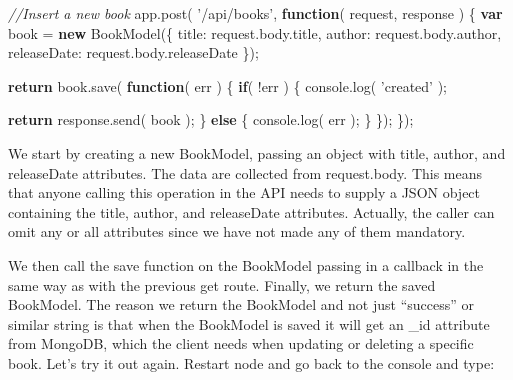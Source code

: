 \documentclass[9pt]{book}
\newenvironment{Shaded}{}{}
\newcommand{\KeywordTok}[1]{\textcolor[rgb]{0.00,0.44,0.13}{\textbf{{#1}}}}
\newcommand{\DataTypeTok}[1]{\textcolor[rgb]{0.56,0.13,0.00}{{#1}}}
\newcommand{\StringTok}[1]{\textcolor[rgb]{0.25,0.44,0.63}{{#1}}}
\newcommand{\CommentTok}[1]{\textcolor[rgb]{0.38,0.63,0.69}{\textit{{#1}}}}
\newcommand{\OtherTok}[1]{\textcolor[rgb]{0.00,0.44,0.13}{{#1}}}
\newcommand{\FunctionTok}[1]{\textcolor[rgb]{0.02,0.16,0.49}{{#1}}}
\newcommand{\NormalTok}[1]{{#1}}
\begin{document}
\begin{Shaded}
\begin{Highlighting}[]
\CommentTok{//Insert a new book}
\OtherTok{app}\NormalTok{.}\FunctionTok{post}\NormalTok{( }\StringTok{'/api/books'}\NormalTok{, }\KeywordTok{function}\NormalTok{( request, response ) \{}
    \KeywordTok{var} \NormalTok{book = }\KeywordTok{new} \FunctionTok{BookModel}\NormalTok{(\{}
        \DataTypeTok{title}\NormalTok{: }\OtherTok{request}\NormalTok{.}\OtherTok{body}\NormalTok{.}\FunctionTok{title}\NormalTok{,}
        \DataTypeTok{author}\NormalTok{: }\OtherTok{request}\NormalTok{.}\OtherTok{body}\NormalTok{.}\FunctionTok{author}\NormalTok{,}
        \DataTypeTok{releaseDate}\NormalTok{: }\OtherTok{request}\NormalTok{.}\OtherTok{body}\NormalTok{.}\FunctionTok{releaseDate}
    \NormalTok{\});}
    
    \KeywordTok{return} \OtherTok{book}\NormalTok{.}\FunctionTok{save}\NormalTok{( }\KeywordTok{function}\NormalTok{( err ) \{}
        \KeywordTok{if}\NormalTok{( !err ) \{}
            \OtherTok{console}\NormalTok{.}\FunctionTok{log}\NormalTok{( }\StringTok{'created'} \NormalTok{);}
            
                        \KeywordTok{return} \OtherTok{response}\NormalTok{.}\FunctionTok{send}\NormalTok{( book );}
            \NormalTok{\} }\KeywordTok{else} \NormalTok{\{}
                \OtherTok{console}\NormalTok{.}\FunctionTok{log}\NormalTok{( err );}
            \NormalTok{\}}
    \NormalTok{\});}
\NormalTok{\});}
\end{Highlighting}
\end{Shaded}

We start by creating a new BookModel, passing an object with title,
author, and releaseDate attributes. The data are collected from
request.body. This means that anyone calling this operation in the API
needs to supply a JSON object containing the title, author, and
releaseDate attributes. Actually, the caller can omit any or all
attributes since we have not made any of them mandatory.

We then call the save function on the BookModel passing in a callback in
the same way as with the previous get route. Finally, we return the
saved BookModel. The reason we return the BookModel and not just
``success'' or similar string is that when the BookModel is saved it
will get an \_id attribute from MongoDB, which the client needs when
updating or deleting a specific book. Let's try it out again. Restart
node and go back to the console and type:
\end{document}
